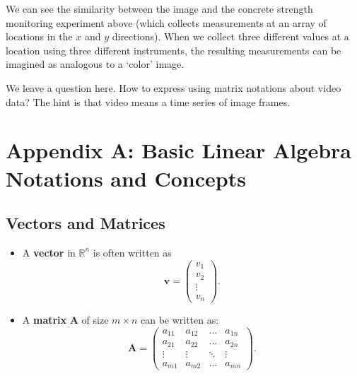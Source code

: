 \documentclass[12pt]{article}
\begin{document}
We can see the similarity between the image and the concrete strength monitoring experiment above (which collects measurements at an array of locations in the $x$ and $y$ directions). When we collect three different values at a location using three different instruments, the resulting measurements can be imagined as analogous to a `color' image.

We leave a question here. How to express using matrix notations about video data? The hint is that video means a time series of image frames. 




\newpage
\appendix
\section*{Appendix A: Basic Linear Algebra Notations and Concepts}

\subsection*{Vectors and Matrices}
\begin{itemize}
    \item A \textbf{vector} in $\mathbb{R}^n$ is often written as 
    \[
        \bm{v} = 
        \begin{pmatrix}
            v_1 \\ 
            v_2 \\ 
            \vdots \\ 
            v_n
        \end{pmatrix}.
    \]
    \item A \textbf{matrix} $\bm{A}$ of size $m \times n$ can be written as:
    \[
        \bm{A} = 
        \begin{pmatrix}
            a_{11} & a_{12} & \dots & a_{1n} \\
            a_{21} & a_{22} & \dots & a_{2n} \\
            \vdots & \vdots & \ddots & \vdots \\
            a_{m1} & a_{m2} & \dots & a_{mn}
        \end{pmatrix}.
    \]
\end{itemize}
\end{document}
